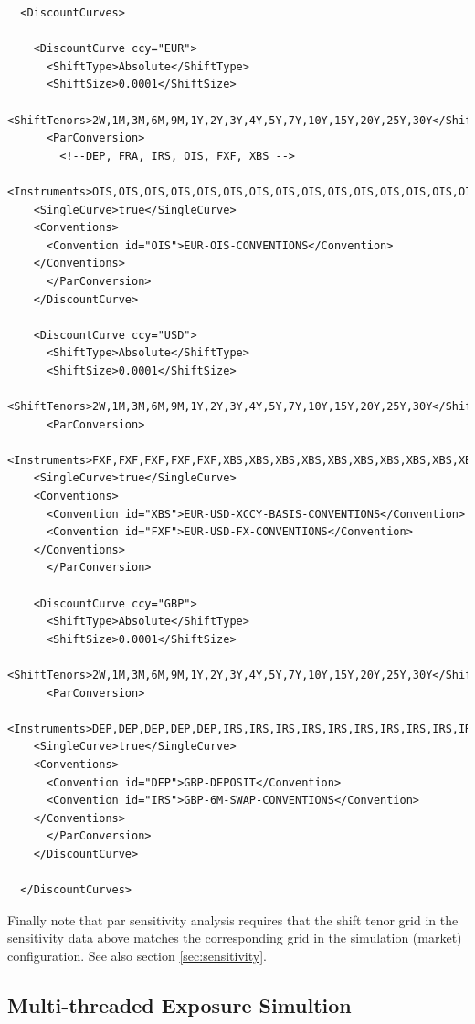 \documentclass[12pt, a4paper]{article}
\begin{document}
\begin{verbatim}
  <DiscountCurves>
  
    <DiscountCurve ccy="EUR">
      <ShiftType>Absolute</ShiftType>
      <ShiftSize>0.0001</ShiftSize>
      <ShiftTenors>2W,1M,3M,6M,9M,1Y,2Y,3Y,4Y,5Y,7Y,10Y,15Y,20Y,25Y,30Y</ShiftTenors>
      <ParConversion>
        <!--DEP, FRA, IRS, OIS, FXF, XBS -->
	<Instruments>OIS,OIS,OIS,OIS,OIS,OIS,OIS,OIS,OIS,OIS,OIS,OIS,OIS,OIS,OIS,OIS</Instruments>
	<SingleCurve>true</SingleCurve>
	<Conventions>
	  <Convention id="OIS">EUR-OIS-CONVENTIONS</Convention>
	</Conventions>
      </ParConversion>
    </DiscountCurve>   
    
    <DiscountCurve ccy="USD">
      <ShiftType>Absolute</ShiftType>
      <ShiftSize>0.0001</ShiftSize>
      <ShiftTenors>2W,1M,3M,6M,9M,1Y,2Y,3Y,4Y,5Y,7Y,10Y,15Y,20Y,25Y,30Y</ShiftTenors>
      <ParConversion>
	<Instruments>FXF,FXF,FXF,FXF,FXF,XBS,XBS,XBS,XBS,XBS,XBS,XBS,XBS,XBS,XBS,XBS</Instruments>
	<SingleCurve>true</SingleCurve>
	<Conventions>
	  <Convention id="XBS">EUR-USD-XCCY-BASIS-CONVENTIONS</Convention>
	  <Convention id="FXF">EUR-USD-FX-CONVENTIONS</Convention>
	</Conventions>
      </ParConversion>

    <DiscountCurve ccy="GBP">
      <ShiftType>Absolute</ShiftType>
      <ShiftSize>0.0001</ShiftSize>
      <ShiftTenors>2W,1M,3M,6M,9M,1Y,2Y,3Y,4Y,5Y,7Y,10Y,15Y,20Y,25Y,30Y</ShiftTenors>
      <ParConversion>
	<Instruments>DEP,DEP,DEP,DEP,DEP,IRS,IRS,IRS,IRS,IRS,IRS,IRS,IRS,IRS,IRS,IRS</Instruments>
	<SingleCurve>true</SingleCurve>
	<Conventions>
	  <Convention id="DEP">GBP-DEPOSIT</Convention>
	  <Convention id="IRS">GBP-6M-SWAP-CONVENTIONS</Convention>
	</Conventions>
      </ParConversion>
    </DiscountCurve>
  
  </DiscountCurves>
\end{verbatim}

Finally note that par sensitivity analysis requires that the shift tenor grid in the sensitivity data above matches the corresponding grid in the simulation (market) configuration.
See also section \ref{sec:sensitivity}.

\subsection{Multi-threaded Exposure Simultion}%
\label{example:41}
\end{document}
